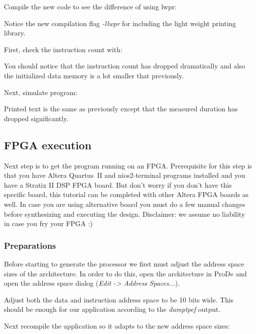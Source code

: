 \documentclass[twoside]{tceusermanual}
\begin{document}
Compile the new code to see the difference of using lwpr:


Notice the new compilation flag \textit{-llwpr} for including the light
weight printing library.

First, check the instruction count with:


You should notice that the instruction count has dropped dramatically
and also the initialized data memory is a lot smaller that previously.

Next, simulate program:


Printed text is the same as previously except that the measured duration
has dropped significantly.

\subsection{FPGA execution}

Next step is to get the program running on an FPGA. Prerequisite for
this step is that you have Altera Quartus~II and nios2-terminal
programs installed and you have a Stratix II DSP FPGA board. But don't
worry if you don't have this specific board, this tutorial can be
completed with other Altera FPGA boards as well. In case you are using
alternative board you must do a few manual changes before synthesizing and
executing the design. Disclaimer: we assume no liability in case you
fry your FPGA :)

\subsubsection{Preparations}

Before starting to generate the processor we first must adjust the
address space sizes of the architecture. In order to do this, open the
architecture in ProDe and open the address space dialog (\textit{Edit
  -> Address Spaces...}).


Adjust both the data and instruction address space to be 10 bits
wide. This should be enough for our application according to the
\textit{dumptpef} output.

Next recompile the application so it adapts to the new address space
sizes:
\end{document}

